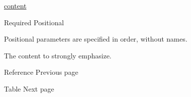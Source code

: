 \href{/docs/reference/foundations/content/}{content}

{Required} {{ Positional }}

\label{parameters-body-positional-tooltip}
Positional parameters are specified in order, without names.

The content to strongly emphasize.

\href{/docs/reference/model/ref/}{\pandocbounded{}}

{ Reference } { Previous page }

\href{/docs/reference/model/table/}{\pandocbounded{}}

{ Table } { Next page }
